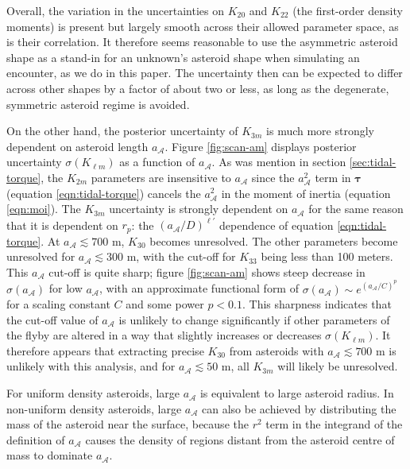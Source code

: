 \documentclass[fleqn,usenatbib]{mnras}
\begin{document}
Overall, the variation in the uncertainties on $K_{20}$ and $K_{22}$ (the first-order density moments) is present but largely smooth across their allowed parameter space, as is their correlation. It therefore seems reasonable to use the asymmetric asteroid shape as a stand-in for an unknown's asteroid shape when simulating an encounter, as we do in this paper. The uncertainty then can be expected to differ across other shapes by a factor of about two or less, as long as the degenerate, symmetric asteroid regime is avoided.

On the other hand, the posterior uncertainty of $K_{3m}$ is much more strongly dependent on asteroid length $a_\mathcal{A}$. Figure \ref{fig:scan-am} displays posterior uncertainty $\sigma(K_{\ell m})$ as a function of $a_\mathcal{A}$. As was mention in section \ref{sec:tidal-torque}, the $K_{2m}$ parameters are insensitive to $a_\mathcal{A}$ since the $a_\mathcal{A}^2$ term in $\bm \tau$ (equation \ref{eqn:tidal-torque}) cancels the $a_\mathcal{A}^2$ in the moment of inertia (equation \ref{eqn:moi}). The $K_{3m}$ uncertainty is strongly dependent on $a_\mathcal{A}$ for the same reason that it is dependent on $r_p$: the $(a_\mathcal{A}/D)^{\ell'}$ dependence of equation \ref{eqn:tidal-torque}. At $a_\mathcal{A} \lesssim 700$ m, $K_{30}$ becomes unresolved. The other parameters become unresolved for $a_\mathcal{A} \lesssim 300$ m, with the cut-off for $K_{33}$ being less than 100 meters. This $a_\mathcal{A}$ cut-off is quite sharp; figure \ref{fig:scan-am} shows steep decrease in $\sigma(a_\mathcal{A})$ for low $a_\mathcal{A}$, with an approximate functional form of $\sigma(a_\mathcal{A}) \sim e^{(a_\mathcal{A}/C)^p}$ for a scaling constant $C$ and some power $p < 0.1$. This sharpness indicates that the cut-off value of $a_\mathcal{A}$ is unlikely to change significantly if other parameters of the flyby are altered in a way that slightly increases or decreases $\sigma(K_{\ell m})$. It therefore appears that extracting precise $K_{30}$ from asteroids with $a_\mathcal{A} \lesssim 700$ m is unlikely with this analysis, and for $a_\mathcal{A} \lesssim 50$ m, all $K_{3m}$ will likely be unresolved.

For uniform density asteroids, large $a_\mathcal{A}$ is equivalent to large asteroid radius. In non-uniform density asteroids, large $a_\mathcal{A}$ can also be achieved by distributing the mass of the asteroid near the surface, because the $r^2$ term in the integrand of the definition of $a_\mathcal{A}$ causes the density of regions distant from the asteroid centre of mass to dominate $a_\mathcal{A}$.
\end{document}
